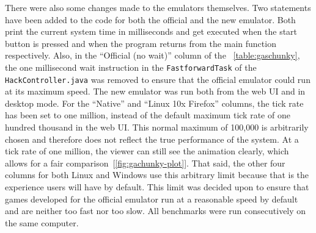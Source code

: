 There were also some changes made to the emulators themselves.
Two statements have been added to the code for both the official and the new emulator.
Both print the current system time in milliseconds and get executed when the start button is pressed and when the program returns from the main function respectively.
Also, in the ``Official (no wait)'' column of the ~\cref{table:gaschunky}, the one millisecond wait instruction in the \verb+FastforwardTask+ of the \verb+HackController.java+ was removed to ensure that the official emulator could run at its maximum speed.
The new emulator was run both from the web UI and in desktop mode.
For the ``Native'' and ``Linux 10x Firefox'' columns, the tick rate has been set to one million, instead of the default maximum tick rate of one hundred thousand in the web UI.
This normal maximum of 100,000 is arbitrarily chosen and therefore does not reflect the true performance of the system.
At a tick rate of one million, the viewer can still see the animation clearly, which allows for a fair comparison~[\ref{fig:gachunky-plot}].
That said, the other four columns for both Linux and Windows use this arbitrary limit because that is the experience users will have by default.
This limit was decided upon to ensure that games developed for the official emulator run at a reasonable speed by default and are neither too fast nor too slow.
All benchmarks were run consecutively on the same computer.
